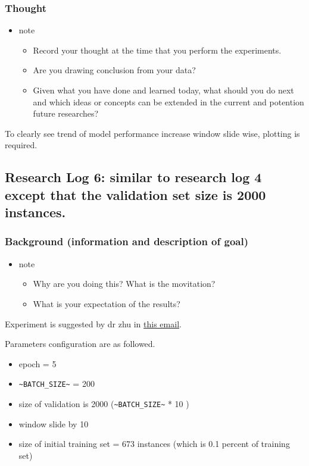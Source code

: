 \documentclass[11pt]{article}
\begin{document}
\subsubsection{Thought}
\label{sec:org4c70e17}
\begin{itemize}
\item note
\begin{itemize}
\item Record your thought at the time that you perform the experiments.
\item Are you drawing conclusion from your data?
\item Given what you have done and learned today, what should you do next and which ideas or concepts can be extended in the current and potention future researches?
\end{itemize}
\end{itemize}

To clearly see trend of model performance increase window slide wise, plotting is required.

\subsection{Research Log 6: similar to research log 4 except that the validation set size is 2000 instances.}
\label{sec:org161cb6d}
\subsubsection{Background (information and description of goal)}
\label{sec:orgb8da8fd}
\begin{itemize}
\item note
\begin{itemize}
\item Why are you doing this? What is the movitation?
\item What is your expectation of the results?
\end{itemize}
\end{itemize}

Experiment is suggested by dr zhu in \href{https://mail.google.com/mail/u/0/\#inbox/FFNDWMGfzXvrGrBQHKdkLqlnMMfJDTdM}{this email}.

Parameters configuration are as followed.

\begin{itemize}
\item epoch = 5
\item \texttt{\textasciitilde{}BATCH\_SIZE\textasciitilde{}} = 200
\item size of validation is 2000 (\texttt{\textasciitilde{}BATCH\_SIZE\textasciitilde{}} * 10 )
\item window slide by 10
\item size of initial training set = 673 instances (which is 0.1 percent of training set)
\end{itemize}
\end{document}
